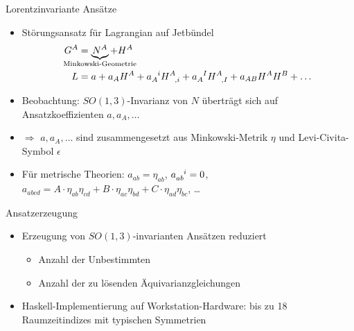 \documentclass{beamer}
\begin{document}
    \begin{frame}{Lorentzinvariante Ansätze}
        \begin{itemize}
            \item Störungsansatz für Lagrangian auf Jetbündel
            \begin{align*}
                G^A &= \underbrace{N^A}_{\mathclap{\text{Minkowski-Geometrie}}} + H^A \\
                L &= a + a_A H^A + a_A^{\hphantom Ai} H^A_{\hphantom{A},i} + a_A^{\hphantom AI} H^A_{\hphantom{A},I} + a_{AB} H^A H^B + \ldots
            \end{align*}
            \item Beobachtung: $SO(1,3)$-Invarianz von $N$ überträgt sich auf Ansatzkoeffizienten $a, a_A, \ldots$
            \item $\Rightarrow$ $a, a_A, \ldots$ sind zusammengesetzt aus
            Minkowski-Metrik $\eta$ und Levi-Civita-Symbol $\epsilon$
            \item Für metrische Theorien: $a_{ab} = \eta_{ab}$, $a_{ab}^{\hphantom{ab}i} = 0$, $a_{abcd} = A\cdot \eta_{ab} \eta_{cd} + B\cdot \eta_{ac} \eta_{bd} + C\cdot \eta_{ad} \eta_{bc}$, \ldots
        \end{itemize}
    \end{frame}

    \begin{frame}{Ansatzerzeugung}
        \begin{itemize}
            \item Erzeugung von $SO(1,3)$-invarianten Ansätzen reduziert
            \begin{itemize}
                \item Anzahl der Unbestimmten
                \item Anzahl der zu lösenden Äquivarianzgleichungen
            \end{itemize}
            \item Haskell-Implementierung auf Workstation-Hardware: bis zu 18 Raumzeitindizes mit typischen Symmetrien
        \end{itemize}
    \end{frame}
\end{document}
